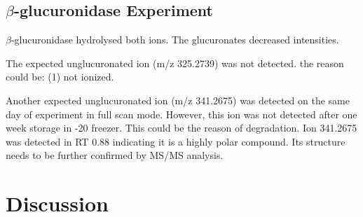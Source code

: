 \subsection{$\beta$-glucuronidase Experiment}
$\beta$-glucuronidase hydrolysed both ions. The glucuronates decreased intensities. 

The expected unglucuronated ion (m/z 325.2739) was not detected. the reason could be: (1) not ionized.

Another expected unglucuronated ion (m/z 341.2675) was detected on the same day of experiment in full scan mode. 
However, this ion was not detected after one week storage in -20 freezer. This could be the reason of degradation. Ion 341.2675 was detected in RT 0.88 indicating it is a highly polar compound. Its structure needs to be further confirmed by MS/MS analysis.


\section{Discussion}


